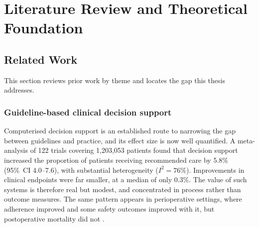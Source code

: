 \chapter{Literature Review and Theoretical Foundation}


\section{Related Work}

This section reviews prior work by theme and locates the gap this thesis addresses.

\subsection{Guideline-based clinical decision support}
Computerised decision support is an established route to narrowing the gap between
guidelines and practice, and its effect size is now well quantified. A meta-analysis \cite{kwan2020} of 122 trials covering 1{,}203{,}053 patients found that
decision support increased the proportion of patients receiving recommended care by 5.8\%
(95\%~CI 4.0--7.6), with substantial heterogeneity ($I^2 = 76\%$). Improvements in clinical
endpoints were far smaller, at a median of only 0.3\%. The value of such systems is therefore real but modest, and concentrated in process rather
than outcome measures. The same pattern appears in perioperative settings, where adherence
improved and some safety outcomes improved with it, but postoperative mortality did not
\cite{cai2024}.

